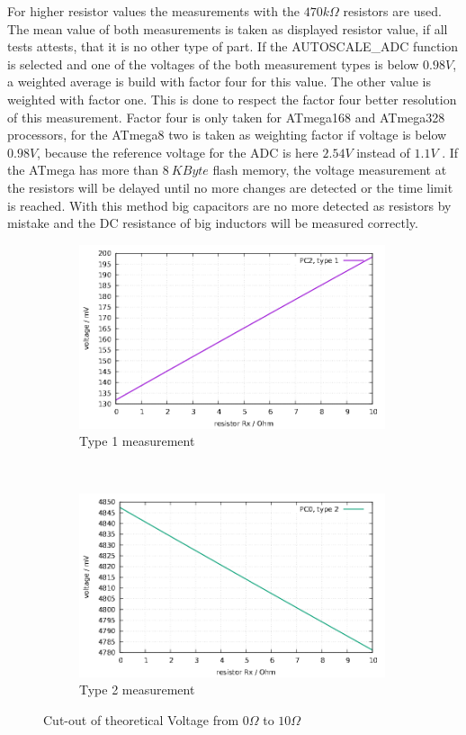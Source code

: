 For higher resistor values the measurements with the \(470k\Omega\) resistors are used. The mean value of both
measurements is taken as displayed resistor value, if all tests attests, that it is no other type of part.
If the AUTOSCALE\_ADC function is selected and one of the voltages of the both measurement types is below \(0.98V\),
a weighted average is build with factor four for this value. The other value is weighted with factor one.
This is done to respect the factor four better resolution of this measurement. Factor four is only taken for 
ATmega168 and ATmega328 processors, for the ATmega8 two is taken as weighting factor if voltage is below \(0.98V\),
because the reference voltage for the ADC is here \(2.54V\) instead of \(1.1V\) .
If the ATmega has more than \(8~KByte\) flash memory, the voltage measurement at the resistors will be delayed until
no more changes are detected or the time limit is reached.
With this method big capacitors are no more detected as resistors by mistake and
the DC resistance of big inductors will be measured correctly.


\begin{figure}[H]
  \begin{subfigure}[b]{9cm}
    \centering
    \includegraphics[width=9cm]{../GNU/RLvlow.pdf}
    \caption{Type 1 measurement}
    \label{fig:RLvlow}
  \end{subfigure}
  ~
  \begin{subfigure}[b]{9cm}
    \centering
    \includegraphics[width=9cm]{../GNU/RLvhigh.pdf}
    \caption{Type 2 measurement}
    \label{fig:RLvhigh}
  \end{subfigure}
  \caption{Cut-out of theoretical Voltage from \(0\Omega\) to \(10\Omega\)}
\end{figure}


